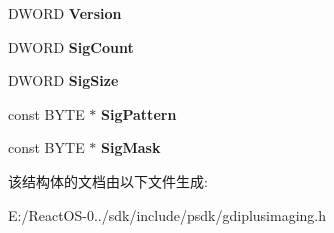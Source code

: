 \begin{DoxyCompactItemize}
D\+W\+O\+RD {\bfseries Version}
\item 
\mbox{\label{struct_image_codec_info_a02c4afa2900b882c5f5cf4987afd359b}} 
D\+W\+O\+RD {\bfseries Sig\+Count}
\item 
\mbox{\label{struct_image_codec_info_a8327fd2cc6bbbf6b126a8d7649d815d0}} 
D\+W\+O\+RD {\bfseries Sig\+Size}
\item 
\mbox{\label{struct_image_codec_info_a9a0999033b4a947c46d27779afc874dd}} 
const B\+Y\+TE $\ast$ {\bfseries Sig\+Pattern}
\item 
\mbox{\label{struct_image_codec_info_a9d8a30fcdeaad7fd4b8f71ea2b84b3b0}} 
const B\+Y\+TE $\ast$ {\bfseries Sig\+Mask}
\end{DoxyCompactItemize}


该结构体的文档由以下文件生成\+:\begin{DoxyCompactItemize}
\item 
E\+:/\+React\+O\+S-\/0../sdk/include/psdk/gdiplusimaging.\+h\end{DoxyCompactItemize}
